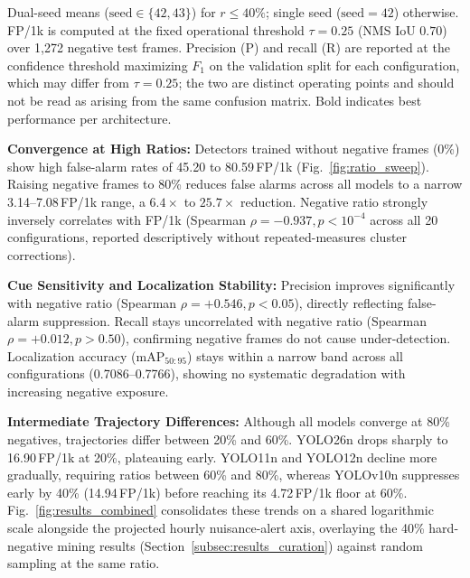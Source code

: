 \documentclass[conference]{IEEEtran}
\begin{document}
\begin{table}[htbp]
\par\vspace{-1pt}
{\footnotesize Dual-seed means ($\text{seed} \in \{42, 43\}$) for $r \le 40\%$; single seed ($\text{seed} = 42$) otherwise. FP/1k is computed at the fixed operational threshold $\tau = 0.25$ (NMS IoU $0.70$) over 1{,}272 negative test frames. Precision (P) and recall (R) are reported at the confidence threshold maximizing $F_1$ on the validation split for each configuration, which may differ from $\tau = 0.25$; the two are distinct operating points and should not be read as arising from the same confusion matrix. Bold indicates best performance per architecture.\par}
\end{table}
\textbf{Convergence at High Ratios:} Detectors trained without negative frames (0\%) show high false-alarm rates of 45.20 to 80.59\,FP/1k (Fig.~\ref{fig:ratio_sweep}). Raising negative frames to 80\% reduces false alarms across all models to a narrow 3.14--7.08\,FP/1k range, a $6.4\times$ to $25.7\times$ reduction. Negative ratio strongly inversely correlates with FP/1k (Spearman $\rho = -0.937, p < 10^{-4}$ across all 20 configurations, reported descriptively without repeated-measures cluster corrections).

\textbf{Cue Sensitivity and Localization Stability:} Precision improves significantly with negative ratio (Spearman $\rho = +0.546, p < 0.05$), directly reflecting false-alarm suppression. Recall stays uncorrelated with negative ratio (Spearman $\rho = +0.012, p > 0.50$), confirming negative frames do not cause under-detection. Localization accuracy ($\text{mAP}_{50:95}$) stays within a narrow band across all configurations (0.7086--0.7766), showing no systematic degradation with increasing negative exposure.

\textbf{Intermediate Trajectory Differences:} Although all models converge at 80\% negatives, trajectories differ between 20\% and 60\%. YOLO26n drops sharply to 16.90\,FP/1k at 20\%, plateauing early. YOLO11n and YOLO12n decline more gradually, requiring ratios between 60\% and 80\%, whereas YOLOv10n suppresses early by 40\% (14.94\,FP/1k) before reaching its 4.72\,FP/1k floor at 60\%. Fig.~\ref{fig:results_combined} consolidates these trends on a shared logarithmic scale alongside the projected hourly nuisance-alert axis, overlaying the 40\% hard-negative mining results (Section~\ref{subsec:results_curation}) against random sampling at the same ratio.
\end{document}
